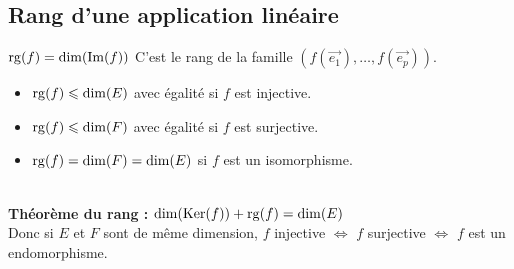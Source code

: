 \subsection{Rang d'une application linéaire}\label{subsec:rang-d'une-application-lineaire}

$\operatorname{rg}(f) = \dim(\Im(f))$ \quad C'est le rang de la famille $(f(\vec{e_1}), \dots, f(\vec{e_p}))$.\\
\begin{itemize}
    \item $\operatorname{rg}(f) \leqslant \dim(E)$ avec égalité si $f$ est injective.
    \item $\operatorname{rg}(f) \leqslant \dim(F)$ avec égalité si $f$ est surjective.
    \item $\operatorname{rg}(f) = \dim(F) = \dim(E)$ si $f$ est un isomorphisme.
\end{itemize}
\ \\
\textbf{Théorème du rang :} $\dim(\operatorname{Ker}(f)) + \operatorname{rg}(f) = \dim(E)$\\
Donc si $E$ et $F$ sont de même dimension, $f$ injective $\iff$ $f$ surjective $\iff$ $f$ est un endomorphisme.

